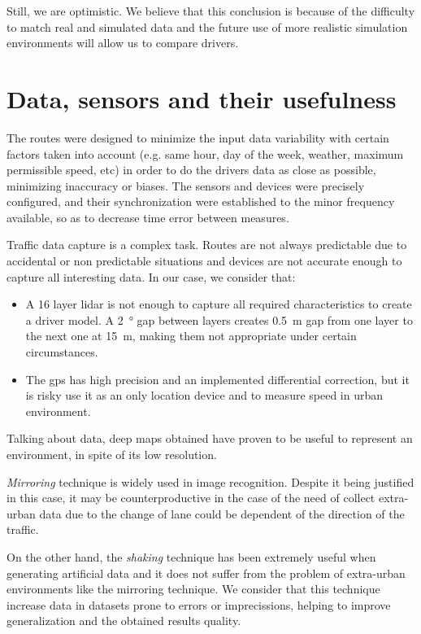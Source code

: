 Still, we are optimistic. We believe that this conclusion is because of the difficulty to match real and simulated data and the future use of more realistic simulation environments will allow us to compare drivers.

\section{Data, sensors and their usefulness}

The routes were designed to minimize the input data variability with certain factors taken into account (e.g. same hour, day of the week, weather, maximum permissible speed, etc) in order to do the drivers data as close as possible, minimizing inaccuracy or biases. The sensors and devices were precisely configured, and their synchronization were established to the minor frequency available, so as to decrease time error between measures.

Traffic data capture is a complex task. Routes are not always predictable due to accidental or non predictable situations and devices are not accurate enough to capture all interesting data. In our case, we consider that:

\begin{itemize}
	\item A 16 layer \acrshort{lidar} is not enough to capture all required characteristics to create a driver model. A \SI{2}{\degree} gap between layers creates \SI{0.5}{\meter} gap from one layer to the next one at \SI{15}{\meter}, making them not appropriate under certain circumstances.
	\item The \acrshort{gps} has high precision and an implemented differential correction, but it is risky use it as an only location device and to measure speed in urban environment.
\end{itemize}

Talking about data, deep maps obtained have proven to be useful to represent an environment, in spite of its low resolution.

\textit{Mirroring} technique is widely used in image recognition. Despite it being justified in this case, it may be counterproductive in the case of the need of collect extra-urban data due to the change of lane could be dependent of the direction of the traffic.

On the other hand, the \textit{shaking} technique has been extremely useful when generating artificial data and it does not suffer from the problem of extra-urban environments like the mirroring technique. We consider that this technique increase data in datasets prone to errors or imprecissions, helping to improve generalization and the obtained results quality.

